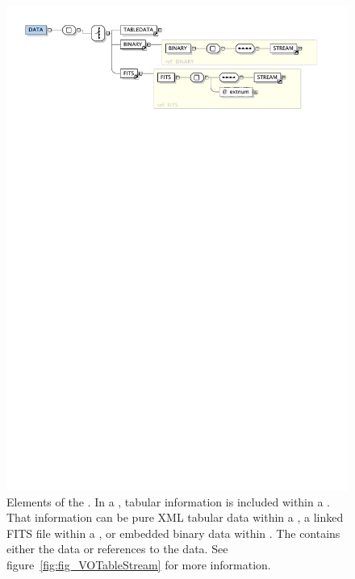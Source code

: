 \begin{figure}[tbp]
	\centering
		\includegraphics[width=\columnwidth]{fig/VOTableData.pdf}
	\caption[Elements of the ]
	{
		Elements of the . In a ,
		tabular information is included within a .
		That information can be pure XML tabular data within a
		, a linked FITS file within a ,
		or embedded binary data within .
		The  contains either the data or references
		to the data. See figure~\ref{fig:fig_VOTableStream} for
		more information.
		\oxygenxml
	}
	\label{fig:fig_VOTableData}
\end{figure}

